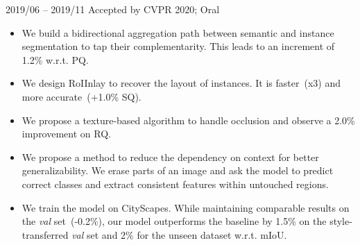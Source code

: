 \documentclass{resume}
\begin{document}
 {2019/06 -- 2019/11} 
\vspace{-0.3em}
 {Accepted by CVPR 2020; Oral}
\vspace{-0.5em}
\begin{itemize}
	\item We build a bidirectional aggregation path between semantic and instance segmentation to tap their complementarity. This leads to an increment of 1.2\% w.r.t. PQ.
	\item We design RoIInlay to recover the layout of instances. It is faster~(x3) and more accurate~(+1.0\% SQ).
	\item We propose a texture-based algorithm to handle occlusion and observe a 2.0\% improvement on RQ. 
\end{itemize}

\vspace{-0.3em}
 {}
\vspace{-0.5em}
\begin{itemize}
		\item We propose a method to reduce the dependency on context for better generalizability. We erase parts of an image and ask the model to predict correct classes and extract consistent features within untouched regions.
	\item We train the model on CityScapes. While maintaining comparable results on the \textit{val} set~(-0.2\%), our model outperforms the baseline by 1.5\% on the style-transferred \textit{val} set and 2\% for the unseen dataset w.r.t. mIoU.
\end{itemize}
\vspace{-1.0em}	
\end{document}
